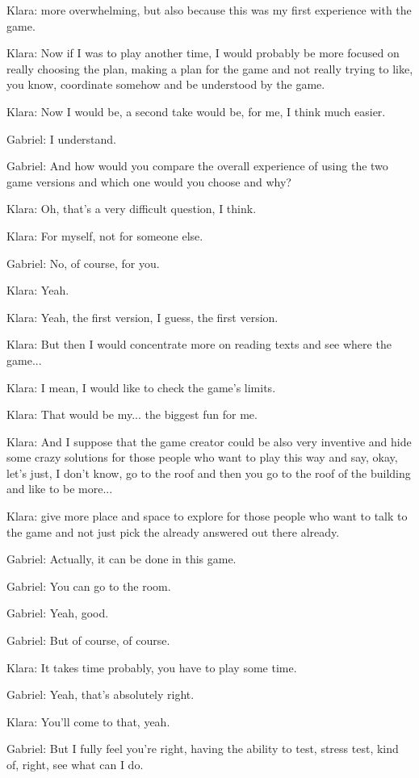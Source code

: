 Klara: more overwhelming, but also because this was my first experience with the game.

Klara: Now if I was to play another time, I would probably be more focused on really choosing the plan, making a plan for the game and not really trying to like, you know, coordinate somehow and be understood by the game.

Klara: Now I would be, a second take would be, for me, I think much easier.

Gabriel: I understand.

Gabriel: And how would you compare the overall experience of using the two game versions and which one would you choose and why?

Klara: Oh, that's a very difficult question, I think.

Klara: For myself, not for someone else.

Gabriel: No, of course, for you.

Klara: Yeah.

Klara: Yeah, the first version, I guess, the first version.

Klara: But then I would concentrate more on reading texts and see where the game...

Klara: I mean, I would like to check the game's limits.

Klara: That would be my... the biggest fun for me.

Klara: And I suppose that the game creator could be also very inventive and hide some crazy solutions for those people who want to play this way and say, okay, let's just, I don't know, go to the roof and then you go to the roof of the building and like to be more...

Klara: give more place and space to explore for those people who want to talk to the game and not just pick the already answered out there already.

Gabriel: Actually, it can be done in this game.

Gabriel: You can go to the room.

Gabriel: Yeah, good.

Gabriel: But of course, of course.

Klara: It takes time probably, you have to play some time.

Gabriel: Yeah, that's absolutely right.

Klara: You'll come to that, yeah.

Gabriel: But I fully feel you're right, having the ability to test, stress test, kind of, right, see what can I do.

